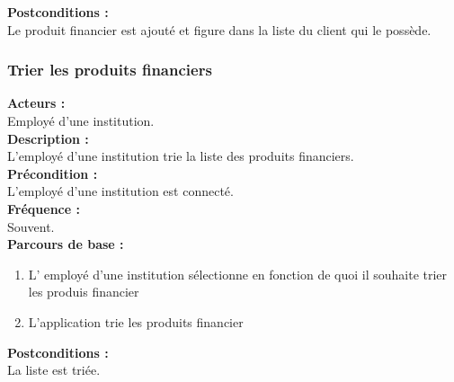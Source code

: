 \documentclass[../rapport.tex]{subfiles}
\begin{document}
\textbf{Postconditions :} \\
Le produit financier est ajouté et figure dans la liste du client qui le possède. \\



\subsubsection{Trier les produits financiers}

\textbf{Acteurs :} \\
Employé d'une institution. \\

\textbf{Description :} \\
L'employé d'une institution trie la liste des produits financiers. \\

\textbf{Précondition :} \\
L'employé d'une institution est connecté. \\

\textbf{Fréquence :} \\
Souvent. \\

\textbf{Parcours de base :} \\
\begin{enumerate}
    \item L’ employé d’une institution sélectionne en fonction de quoi il souhaite trier les produis financier
    \item L’application trie les produits financier
\end{enumerate}
\bigskip

\textbf{Postconditions :} \\
La liste est triée. \\

\newpage
\end{document}
